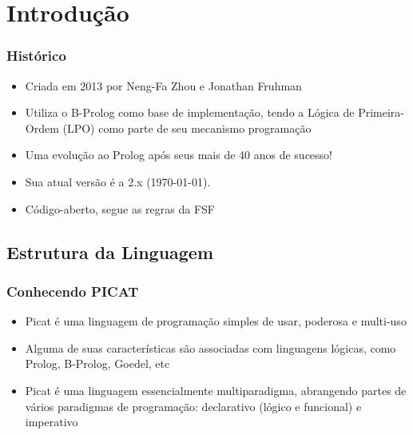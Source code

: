 \section{Introdução}
\begin{frame}

    \frametitle{Histórico}

    \begin{itemize}
      \item Criada em 2013 por Neng-Fa Zhou e Jonathan Fruhman

      \item Utiliza o B-Prolog como base de implementação, tendo
      a Lógica de Primeira-Ordem (LPO) como parte de seu mecanismo programação

\pause
      \item Uma evolução ao Prolog após seus mais de 40 anos de sucesso!

\pause
      \item Sua atual versão é a 2.x (\today).
\pause
      \item Código-aberto, segue as regras da FSF

    \end{itemize}
\end{frame}


\subsection{Estrutura da Linguagem}

\begin{frame}
	\frametitle{Conhecendo PICAT}
    
    \begin{itemize}
    
    	\item Picat é uma linguagem de programação simples de usar, poderosa e multi-uso
        
        \item Alguma de suas características 
         são associadas com linguagens lógicas, como Prolog, B-Prolog, Goedel, etc
        
        \pause
        \item Picat é uma linguagem essencialmente multiparadigma,
        abrangendo partes de vários paradigmas de programação: declarativo (lógico e funcional) e     imperativo
        
        
    \end{itemize}
    
\end{frame}

